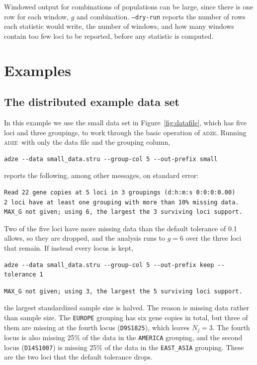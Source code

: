 \documentclass[11pt]{article}
\newcommand{\prog}{\textsc{adze}}
\newcommand{\flag}[1]{\texttt{#1}}
\begin{document}
Windowed output for combinations of populations can be large, since there is
one row for each window, $g$ and combination. \flag{--dry-run} reports the
number of rows each statistic would write, the number of windows, and how many
windows contain too few loci to be reported, before any statistic is
computed.



\section{Examples}

\subsection{The distributed example data set}
\label{sec:examplesmall}

In this example we use the small data set in Figure~\ref{fig:datafile}, which
has five loci and three groupings, to work through the basic operation of
\prog. Running \prog\ with only the data file and the grouping column,
\begin{Verbatim}[xleftmargin=1em]
adze --data small_data.stru --group-col 5 --out-prefix small
\end{Verbatim}
\noindent reports the following, among other messages, on standard error:
\begin{Verbatim}[xleftmargin=1em,fontsize=\small]
Read 22 gene copies at 5 loci in 3 groupings (d:h:m:s 0:0:0:0.00)
2 loci have at least one grouping with more than 10% missing data.
MAX_G not given; using 6, the largest the 3 surviving loci support.
\end{Verbatim}
\noindent Two of the five loci have more missing data than the default
tolerance of 0.1 allows, so they are dropped, and the analysis runs to $g = 6$
over the three loci that remain. If instead every locus is kept,
\begin{Verbatim}[xleftmargin=1em]
adze --data small_data.stru --group-col 5 --out-prefix keep --tolerance 1
\end{Verbatim}
\begin{Verbatim}[xleftmargin=1em,fontsize=\small]
MAX_G not given; using 3, the largest the 5 surviving loci support.
\end{Verbatim}
\noindent the largest standardized sample size is halved. The reason is
missing data rather than sample size. The \texttt{EUROPE} grouping has six gene
copies in total, but three of them are missing at the fourth locus
(\texttt{D9S1825}), which leaves $N_j = 3$. The fourth locus is also missing
25\% of the data in the \texttt{AMERICA} grouping, and the second locus
(\texttt{D14S1007}) is missing 25\% of the data in the \texttt{EAST\_ASIA}
grouping. These are the two loci that the default tolerance drops.
\end{document}
